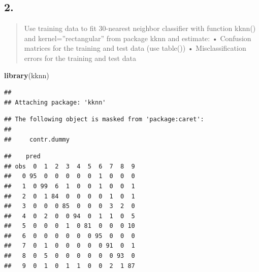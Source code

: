 \documentclass[
]{article}
\newenvironment{Shaded}{\begin{snugshade}}{\end{snugshade}}
\newcommand{\AttributeTok}[1]{\textcolor[rgb]{0.13,0.29,0.53}{#1}}
\newcommand{\CommentTok}[1]{\textcolor[rgb]{0.56,0.35,0.01}{\textit{#1}}}
\newcommand{\DecValTok}[1]{\textcolor[rgb]{0.00,0.00,0.81}{#1}}
\newcommand{\FunctionTok}[1]{\textcolor[rgb]{0.13,0.29,0.53}{\textbf{#1}}}
\newcommand{\NormalTok}[1]{#1}
\newcommand{\OtherTok}[1]{\textcolor[rgb]{0.56,0.35,0.01}{#1}}
\newcommand{\SpecialCharTok}[1]{\textcolor[rgb]{0.81,0.36,0.00}{\textbf{#1}}}
\newcommand{\StringTok}[1]{\textcolor[rgb]{0.31,0.60,0.02}{#1}}
\begin{document}
\hypertarget{section-1}{%
\subsection{2.}\label{section-1}}

\begin{quote}
Use training data to fit 30-nearest neighbor classifier with function
kknn() and kernel=''rectangular'' from package kknn and estimate: •
Confusion matrices for the training and test data (use table()) •
Misclassification errors for the training and test data
\end{quote}

\begin{Shaded}
\begin{Highlighting}[]
\FunctionTok{library}\NormalTok{(kknn)}
\end{Highlighting}
\end{Shaded}

\begin{verbatim}
## 
## Attaching package: 'kknn'
\end{verbatim}

\begin{verbatim}
## The following object is masked from 'package:caret':
## 
##     contr.dummy
\end{verbatim}

\begin{Shaded}
\end{Shaded}

\begin{verbatim}
##    pred
## obs  0  1  2  3  4  5  6  7  8  9
##   0 95  0  0  0  0  0  1  0  0  0
##   1  0 99  6  1  0  0  1  0  0  1
##   2  0  1 84  0  0  0  0  1  0  1
##   3  0  0  0 85  0  0  0  3  2  0
##   4  0  2  0  0 94  0  1  1  0  5
##   5  0  0  0  1  0 81  0  0  0 10
##   6  0  0  0  0  0  0 95  0  0  0
##   7  0  1  0  0  0  0  0 91  0  1
##   8  0  5  0  0  0  0  0  0 93  0
##   9  0  1  0  1  1  0  0  2  1 87
\end{verbatim}
\end{document}
